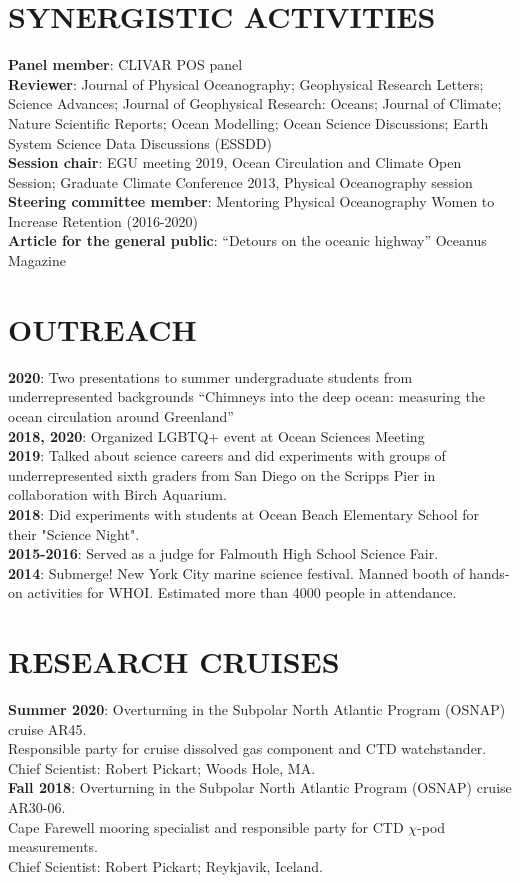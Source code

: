 \documentclass[paper=letter,fontsize=11pt]{scrartcl} %
\newcommand{\NewPart}[2]{\section*{\uppercase{#1} #2}}
\newcommand{\ShortEntry}[2]{\normalsize \noindent \textbf{#1}: #2 \\ }
\begin{document}
\NewPart{Synergistic Activities}{}
\ShortEntry{Panel member}{CLIVAR POS panel}
\ShortEntry{Reviewer}{Journal of Physical Oceanography; Geophysical Research Letters; Science Advances; Journal of Geophysical Research: Oceans; Journal of Climate; Nature Scientific Reports; Ocean Modelling; Ocean Science Discussions; Earth System Science Data Discussions (ESSDD)}
\ShortEntry{Session chair}{EGU meeting 2019, Ocean Circulation and Climate Open Session; Graduate Climate Conference 2013, Physical Oceanography session}
\ShortEntry{Steering committee member}{Mentoring Physical Oceanography Women to Increase Retention (2016-2020)}
\ShortEntry{Article for the general public}{ ``Detours on the oceanic highway'' Oceanus Magazine}

\NewPart{Outreach}{}
\ShortEntry{2020}{Two presentations to summer undergraduate students from underrepresented backgrounds ``Chimneys into the deep ocean: measuring the ocean circulation around Greenland''}
\ShortEntry{2018, 2020}{Organized LGBTQ+ event at Ocean Sciences Meeting}
\ShortEntry{2019}{Talked about science careers and did experiments with groups of underrepresented sixth graders from San Diego on the Scripps Pier in collaboration with Birch Aquarium.}
\ShortEntry{2018}{Did experiments with students at Ocean Beach Elementary School for their "Science Night".}
\ShortEntry{2015-2016}{Served as a judge for Falmouth High School Science Fair.}
\ShortEntry{2014}{Submerge! New York City marine science festival. Manned booth of hands-on activities for WHOI. Estimated more than 4000 people in attendance.}

\NewPart{Research Cruises}{}

\ShortEntry{Summer 2020}{Overturning in the Subpolar North Atlantic Program (OSNAP) cruise AR45.\\ Responsible party for cruise dissolved gas component and CTD watchstander.\\ Chief Scientist: Robert Pickart; Woods Hole, MA.}

\ShortEntry{Fall 2018}{Overturning in the Subpolar North Atlantic Program (OSNAP) cruise AR30-06.\\ Cape Farewell mooring specialist and responsible party for CTD $\chi$-pod measurements.\\ Chief Scientist: Robert Pickart; Reykjavik, Iceland.}
\end{document}
